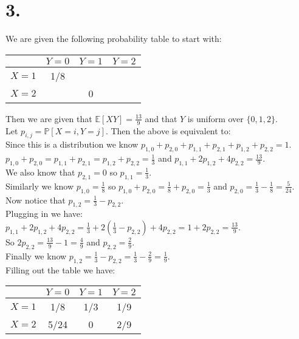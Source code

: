 \documentclass{article}
\begin{document}
\section*{3.}
\begin{center}
\doublespacing
    We are given the following probability table to start with:
    \break\break
    \begin{tabular}{|c|c|c|c|}
        \hline
         & $Y = 0$ & $Y = 1$ & $Y = 2$ \\
         \hline
         $X = 1$ & 1/8 & & \\
         \hline
         $X = 2$ & & 0 & \\
         \hline
    \end{tabular}
    \break\break
    Then we are given that $\mathbb{E}[XY] =\frac{13}{9}$ and that $Y$ is uniform over $\{0, 1, 2\}$.
    \\Let $p_{i,j} =\mathbb{P}[X = i, Y = j]$. Then the above is equivalent to:
    \\Since this is a distribution we know $p_{1,0} + p_{2,0} + p_{1,1} + p_{2,1} + p_{1,2} + p_{2,2} = 1$.
    \\$p_{1,0} + p_{2,0} = p_{1,1} + p_{2,1} = p_{1,2} + p_{2,2} =\frac{1}{3}$ and $p_{1,1} + 2p_{1,2} + 4p_{2,2} =\frac{13}{9}$.
    \\We also know that $p_{2,1} = 0$ so $p_{1,1} = \frac{1}{3}$.
    \\Similarly we know $p_{1,0} =\frac{1}{8}$ so $p_{1,0} + p_{2,0} =\frac{1}{8} + p_{2,0} =\frac{1}{3}$ and $p_{2,0} =\frac{1}{3} -\frac{1}{8} =\frac{5}{24}$.
    \\Now notice that $p_{1,2} =\frac{1}{3} - p_{2,2}$.
    \\Plugging in we have:
    \\$p_{1,1} + 2p_{1,2} + 4p_{2,2} =\frac{1}{3} + 2(\frac{1}{3} - p_{2,2}) + 4p_{2,2} = 1 + 2p_{2,2} =\frac{13}{9}$.
    \\So $2p_{2,2} =\frac{13}{9} - 1 =\frac{4}{9}$ and $p_{2,2} =\frac{2}{9}$.
    \\Finally we know $p_{1,2} =\frac{1}{3} - p_{2,2} =\frac{1}{3} -\frac{2}{9} =\frac{1}{9}$.
    \break
    \\Filling out the table we have:
    \break\break
    \begin{tabular}{|c|c|c|c|}
        \hline
         & $Y = 0$ & $Y = 1$ & $Y = 2$ \\
         \hline
         $X = 1$ & 1/8 & 1/3 & 1/9 \\
         \hline
         $X = 2$ & 5/24 & 0 & 2/9 \\
         \hline
    \end{tabular}
\end{center}
\end{document}

